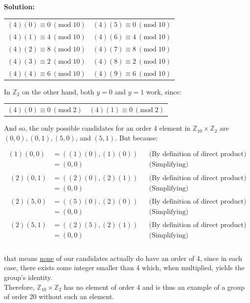 \documentclass{article}
\newenvironment{solution}{
	\vspace{.5em}
	\par
	\begin{adjustwidth}{1.5em}{}
	\textbf{{Solution:}}
	\par
	\vspace{.5em}
}{
	\vspace{1em}
	\end{adjustwidth}
	\setcounter{step}{0}
}
\newcounter{step}
\newcommand{\dprod}[2]{\mathbb{Z}_{#1} \times \mathbb{Z}_{#2}}
\renewcommand{\mod}[1]{\ (\text{mod} \; {#1})}
\begin{document}
\begin{solution}
	\begin{tabularx}{\linewidth}{Y Y}
		$(4)(0) \equiv 0 \mod{10}$ & $(4)(5) \equiv 0 \mod{10}$ \\
		$(4)(1) \equiv 4 \mod{10}$ & $(4)(6) \equiv 4 \mod{10}$ \\
		$(4)(2) \equiv 8 \mod{10}$ & $(4)(7) \equiv 8 \mod{10}$ \\
		$(4)(3) \equiv 2 \mod{10}$ & $(4)(8) \equiv 2 \mod{10}$ \\
		$(4)(4) \equiv 6 \mod{10}$ & $(4)(9) \equiv 6 \mod{10}$ \\
	\end{tabularx}

	\vspace{2em}

	In $\mathbb{Z}_{2}$ on the other hand, both $y = 0$ and $y = 1$ work, since:

	\vspace{2em}

	\begin{tabularx}{\linewidth}{Y Y}
		$(4)(0) \equiv 0 \mod{2}$ & $(4)(1) \equiv 0 \mod{2}$ \\
	\end{tabularx}

	\vspace{2em}

	And so, the only possible candidates for an order 4 element in $\dprod{10}{2}$ are $(0, 0), (0, 1), (5, 0)$, and $(5, 1)$. But because:

	\begin{align*}
		(1)(0, 0) &= ((1)(0), (1)(0)) &&\text{(By definition of direct product)} \\
		&= (0, 0) &&\text{(Simplifying)} \\\\\
		(2)(0, 1) &= ((2)(0), (2)(1)) &&\text{(By definition of direct product)} \\
		&= (0, 0) &&\text{(Simplifying)} \\\\\
		(2)(5, 0) &= ((5)(0), (2)(0)) &&\text{(By definition of direct product)} \\
		&= (0, 0) &&\text{(Simplifying)} \\\\\
		(2)(5, 1) &= ((2)(5), (2)(1)) &&\text{(By definition of direct product)} \\
		&= (0, 0) &&\text{(Simplifying)} \\\\\
	\end{align*}

	that means \underline{none} of our candidates actually do have an order of 4, since in each case, there exists some integer smaller than 4 which, when multiplied, yields the group's identity. \\

	Therefore, $\dprod{10}{2}$ has no element of order 4 and is thus an example of a group of order 20 without such an element.
\end{solution}
\end{document}
